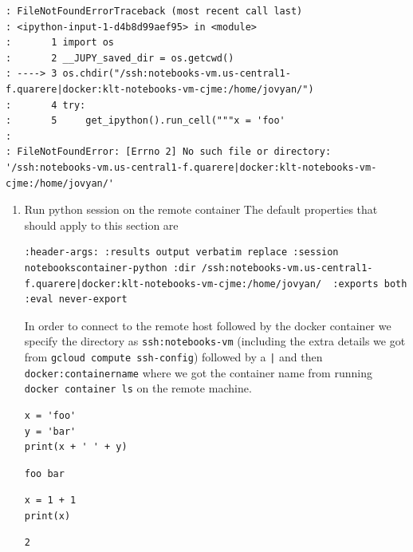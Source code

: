 \documentclass[11pt]{article}
\begin{document}
\begin{verbatim}
: FileNotFoundErrorTraceback (most recent call last)
: <ipython-input-1-d4b8d99aef95> in <module>
:       1 import os
:       2 __JUPY_saved_dir = os.getcwd()
: ----> 3 os.chdir("/ssh:notebooks-vm.us-central1-f.quarere|docker:klt-notebooks-vm-cjme:/home/jovyan/")
:       4 try:
:       5     get_ipython().run_cell("""x = 'foo'
:
: FileNotFoundError: [Errno 2] No such file or directory: '/ssh:notebooks-vm.us-central1-f.quarere|docker:klt-notebooks-vm-cjme:/home/jovyan/'
\end{verbatim}

\begin{enumerate}
\item Run python session on the remote container
\label{sec:org30a48f4}
The default properties that should apply to this section are

\begin{verbatim}
:header-args: :results output verbatim replace :session notebookscontainer-python :dir /ssh:notebooks-vm.us-central1-f.quarere|docker:klt-notebooks-vm-cjme:/home/jovyan/  :exports both  :eval never-export
\end{verbatim}

In order to connect to the remote host followed by the docker container we specify the directory as \texttt{ssh:notebooks-vm} (including the extra details we got from \texttt{gcloud compute ssh-config}) followed by a \texttt{|} and then \texttt{docker:containername} where we got the container name from running \texttt{docker container ls} on the remote machine.

\begin{verbatim}
x = 'foo'
y = 'bar'
print(x + ' ' + y)
\end{verbatim}

\begin{verbatim}
foo bar
\end{verbatim}


\begin{verbatim}
x = 1 + 1
print(x)
\end{verbatim}

\begin{verbatim}
2
\end{verbatim}
\end{enumerate}
\end{document}
